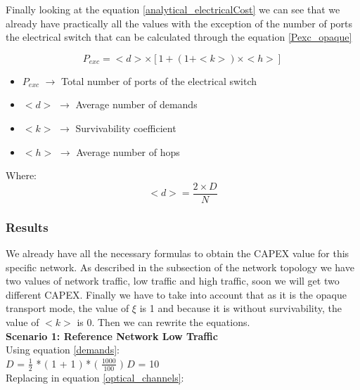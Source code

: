 Finally looking at the equation \ref{analytical_electricalCost} we can see that we already have practically all the values with the exception of the number of ports the electrical switch that can be calculated through the equation \ref{Pexc_opaque}

\begin{equation}
P_{exc} = <d> \times [1 + \left(1 + <k>\right) \times <h>]
\label{Pexc_opaque}
\end{equation}

\begin{itemize}
\item{$P_{exc}$ $\rightarrow$ Total number of ports of the electrical switch}
\item{$<d>$		$\rightarrow$ Average number of demands}
\item{$<k>$		$\rightarrow$ Survivability coefficient}	
\item{$<h>$	    $\rightarrow$ Average number of hops}
\end{itemize}

Where:
\begin{equation}
<d> = \frac{2 \times D}{N}
\label{average_demand}
\end{equation}

\subsubsection{Results}

We already have all the necessary formulas to obtain the CAPEX value for this specific network. As described in the subsection of the network topology we have two values of network traffic, low traffic and high traffic, soon we will get two different CAPEX. Finally we have to take into account that as it is the opaque transport mode, the value of $\xi$ is 1 and because it is without survivability, the value of $<k>$ is 0. Then we can rewrite the equations.\\

\textbf{Scenario 1: Reference Network Low Traffic}\\

Using equation \ref{demands}:\\

$D$ = $\frac{1}{2}$ * $($ 1 + 1 $)$ * $($ $\frac{1000}{100}$ $)$ \qquad \qquad $D$ = 10\\

Replacing in equation \ref{optical_channels}:\\

